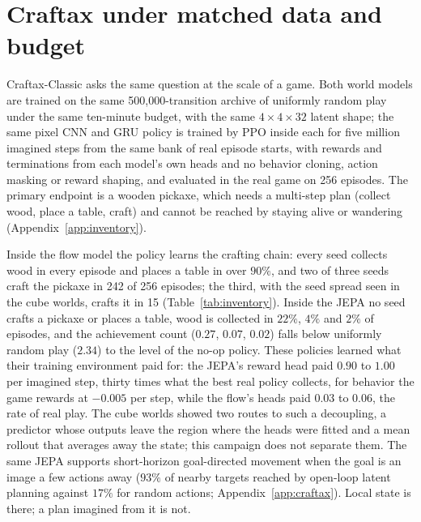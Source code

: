 \section{Craftax under matched data and budget}
\label{sec:craftax}

Craftax-Classic asks the same question at the scale of a game. Both world models are trained on
the same 500,000-transition archive of uniformly random play under the same ten-minute budget, with
the same $4\times4\times32$ latent shape; the same pixel CNN and GRU policy is trained by PPO
inside each for five million imagined steps from the same bank of real episode starts, with
rewards and terminations from each model's own heads and no behavior cloning, action masking or
reward shaping, and evaluated in the real game on 256 episodes. The primary
endpoint is a wooden pickaxe, which needs a multi-step plan (collect wood, place a table, craft) and
cannot be reached by staying alive or wandering (Appendix~\ref{app:inventory}).

\begin{table}[t]
\centering
\caption{\textbf{Craftax-Classic, one pixel policy trained for five million imagined steps inside
each model, 256 native episodes per policy.} Wood and table: fraction of episodes with the
achievement; pickaxe: episodes ending with a wooden pickaxe. ``Imagined $r$'': mean reward per
imagined step paid by the model's reward head at the last update; real play collects at most
$0.03$ per step. State-blind rows use the identical evaluator.}
\label{tab:inventory}
\small
{}
\end{table}

Inside the flow model the policy learns the crafting chain: every seed collects wood in every
episode and places a table in over $90\%$, and two of three seeds craft the pickaxe in 242 of 256
episodes; the third, with the seed spread seen in the cube worlds, crafts it in 15
(Table~\ref{tab:inventory}). Inside the JEPA no seed crafts a pickaxe or places a table, wood is
collected in $22\%$, $4\%$ and $2\%$ of episodes, and the achievement count ($0.27$, $0.07$,
$0.02$) falls below uniformly random play ($2.34$) to the level of the no-op policy. These
policies learned what their training environment paid for: the JEPA's reward head paid $0.90$ to
$1.00$ per imagined step, thirty times what the best real policy collects, for behavior the game
rewards at $-0.005$ per step, while the flow's heads paid $0.03$ to $0.06$, the rate of real play.
The cube worlds showed two routes to such a decoupling, a predictor whose outputs leave the region
where the heads were fitted and a mean rollout that averages away the state; this campaign does not
separate them. The same JEPA supports short-horizon goal-directed movement when the goal is an
image a few actions away ($93\%$ of nearby targets reached by open-loop latent planning against
$17\%$ for random actions; Appendix~\ref{app:craftax}). Local state is there; a plan imagined from
it is not.
